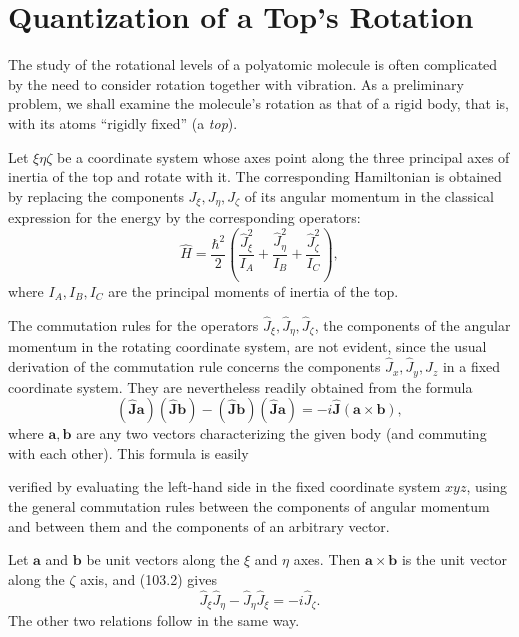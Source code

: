 \setcounter{section}{102}
\section{Quantization of a Top's Rotation}

The study of the rotational levels of a polyatomic molecule is often complicated by the need to consider rotation together with vibration. As a preliminary problem, we shall examine the molecule's rotation as that of a rigid body, that is, with its atoms ``rigidly fixed'' (a \emph{top}).

Let $\xi\eta\zeta$ be a coordinate system whose axes point along the three principal axes of inertia of the top and rotate with it. The corresponding Hamiltonian is obtained by replacing the components $J_\xi,J_\eta,J_\zeta$ of its angular momentum in the classical expression for the energy by the corresponding operators:
\begin{equation}
 \hat H=\frac{\hbar^2}{2}\left(\frac{\hat J_\xi^2}{I_A}+\frac{\hat J_\eta^2}{I_B}+\frac{\hat J_\zeta^2}{I_C}\right), \tag{103.1}
\end{equation}
where $I_A,I_B,I_C$ are the principal moments of inertia of the top.

The commutation rules for the operators $\hat J_\xi,\hat J_\eta,\hat J_\zeta$, the components of the angular momentum in the rotating coordinate system, are not evident, since the usual derivation of the commutation rule concerns the components $\hat J_x,\hat J_y,\hat J_z$ in a fixed coordinate system. They are nevertheless readily obtained from the formula
\begin{equation}
 (\hat{\mathbf J}\mathbf a)(\hat{\mathbf J}\mathbf b)-(\hat{\mathbf J}\mathbf b)(\hat{\mathbf J}\mathbf a)=-i\hat{\mathbf J}(\mathbf a\times\mathbf b), \tag{103.2}
\end{equation}
where $\mathbf a,\mathbf b$ are any two vectors characterizing the given body (and commuting with each other). This formula is easily

verified by evaluating the left-hand side in the fixed coordinate system $xyz$, using the general commutation rules between the components of angular momentum and between them and the components of an arbitrary vector.

Let $\mathbf a$ and $\mathbf b$ be unit vectors along the $\xi$ and $\eta$ axes. Then $\mathbf a\times\mathbf b$ is the unit vector along the $\zeta$ axis, and (103.2) gives
\begin{equation}
 \hat J_\xi\hat J_\eta-\hat J_\eta\hat J_\xi=-i\hat J_\zeta. \tag{103.3}
\end{equation}
The other two relations follow in the same way.

